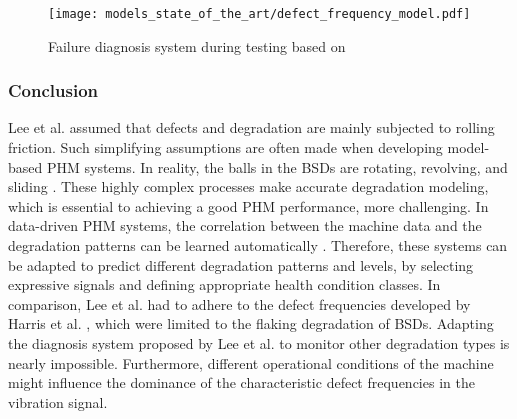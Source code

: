 \begin{figure}[H]
  \centering
  \texttt{[image: models\_state\_of\_the\_art/defect\_frequency\_model.pdf]}
  \caption{Failure diagnosis system during testing based on \cite{Lee2015}}
  \label{fig:defect_frequency_model}
\end{figure}

\subsubsection{Conclusion}
Lee et al. \cite{Lee2015} assumed that defects and degradation are mainly subjected to rolling friction. Such simplifying assumptions are often made when developing model-based PHM systems. In reality, the balls in the BSDs are rotating, revolving, and sliding \cite{Lee2015}. These highly complex processes make accurate degradation modeling, which is essential to achieving a good PHM performance, more challenging. In data-driven PHM systems, the correlation between the machine data and the degradation patterns can be learned automatically \cite{ZHAO2019213}. Therefore, these systems can be adapted to predict different degradation patterns and levels, by selecting expressive signals and defining appropriate health condition classes. In comparison, Lee et al. \cite{Lee2015} had to adhere to the defect frequencies developed by Harris et al. \cite{Harris1996}, which were limited to the flaking degradation of BSDs. Adapting the diagnosis system proposed by Lee et al. \cite{Lee2015} to monitor other degradation types is nearly impossible. Furthermore, different operational conditions of the machine might influence the dominance of the characteristic defect frequencies in the vibration signal.
